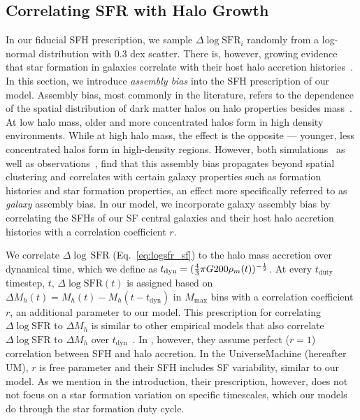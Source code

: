 \documentclass[12pt, letterpaper, preprint, tighten]{aastex62}
\newcommand{\edt}[1]{{\color{dred}{\bf} #1}}
\newcommand{\logsfr}{\log\mathrm{SFR}}
\begin{document}
\subsection{Correlating SFR with Halo Growth}
In our fiducial SFH prescription, we sample $\Delta \logsfr_i$ randomly from a
log-normal distribution with $0.3$ dex scatter. There is, however, growing evidence 
that star formation in galaxies correlate with their host halo accretion 
histories~\citep[\emph{e.g.}][]{lim2016, tojeiro2017, tinker2018b}.
In this section, we introduce \emph{assembly bias} into the SFH prescription of our 
model. Assembly bias, most commonly in the literature, refers to the dependence of the
spatial distribution of dark matter halos on halo properties besides
mass~\citep{gao2005,wechsler2006,gao2007,wetzel2007,li2008,sunayama2016}.
At low halo mass, older and more concentrated halos form in high density environments.
While at high halo mass, the effect is the opposite --- younger, less concentrated
halos form in high-density regions. However, both
simulations~\citep{croton2007, artale2018, zehavi2018} as well as
observations~\citep{yang2006,wang2008,tinker2011,wang2013,lacerna2014,calderon2018,tinker2018},
find that this assembly bias propagates beyond spatial clustering and correlates
with certain galaxy properties such as formation histories and star formation
properties, an effect more specifically referred to as {\em galaxy} assembly bias.
In our model, we incorporate galaxy assembly bias by correlating the SFHs
of our SF central galaxies and their host halo accretion histories
with a correlation coefficient $r$.

We correlate $\Delta\log\,\mathrm{SFR}$ (Eq.~\ref{eq:logsfr_sf}) to the halo 
mass accretion over dynamical time, 
\edt{which we define as $t_{\rm dyn} = (\frac{4}{3}\pi G 200\rho_m(t))^{-\frac{1}{2}}$}.
At every $t_\mathrm{duty}$ timestep, $t$, $\Delta\logsfr(t)$ is assigned based on 
$\Delta M_h(t) = M_h(t) - M_h(t - t_\mathrm{dyn})$ in $M_\mathrm{max}$ bins
with a correlation coefficient $r$, an additional parameter to our model. 
This prescription for correlating $\Delta\log\mathrm{SFR}$ to $\Delta M_h$ is
similar to other empirical models that also correlate $\Delta\log\mathrm{SFR}$
to $\Delta M_h$ over $t_\mathrm{dyn}$~\citep{rodriguez-puebla2016a, behroozi2019}.
In \cite{rodriguez-puebla2016a}, however, they assume perfect ($r=1$) correlation
between SFH and halo accretion. In the \cite{behroozi2019} {\sc UniverseMachine}
(hereafter UM), $r$ is free parameter and their SFH includes SF variability,
similar to our model. As we mention in the introduction, their prescription,
however, does not not focus on a star formation variation on specific timescales,
which our models do through the star formation duty cycle.
\end{document}
